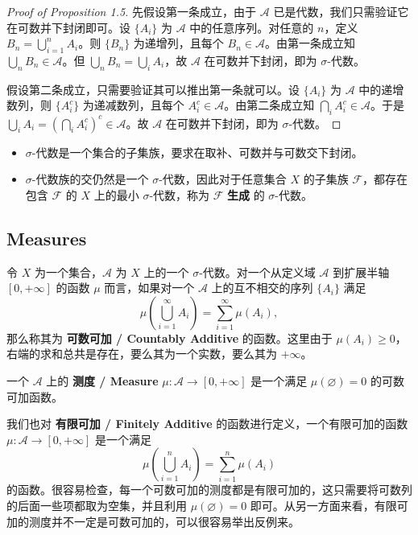 \documentclass[11pt]{article}
\newcommand{\calA}{\mathcal{A}}
\newcommand{\calF}{\mathcal{F}}
\newcommand{\diam}{\varnothing}
\begin{document}
\begin{proof}[Proof of Proposition 1.5]
    先假设第一条成立，由于 $\calA$ 已是代数，我们只需验证它在可数并下封闭即可。设 $\{A_i\}$ 为 $\calA$ 中的任意序列。对任意的 $n$，定义 $B_n = \bigcup_{i=1}^n A_i$。则 $\{B_n\}$ 为递增列，且每个 $B_n \in \calA$。由第一条成立知 $\bigcup_n B_n \in \calA$。但 $\bigcup_n B_n = \bigcup_i A_i$，故 $\calA$ 在可数并下封闭，即为 $\sigma$-代数。

    假设第二条成立，只需要验证其可以推出第一条就可以。设 $\{A_i\}$ 为 $\calA$ 中的递增数列，则 $\{A_i^c\}$ 为递减数列，且每个 $A_i^c \in \calA$。由第二条成立知 $\bigcap_i A_i^c \in \calA$。于是 $\bigcup_i A_i = \left(\bigcap_i A_i^c\right)^c \in \calA$。故 $\calA$ 在可数并下封闭，即为 $\sigma$-代数。
\end{proof}

\begin{cbox}[title=Takeaway for Section 1.1]
    \begin{itemize}
        \item $\sigma$-代数是一个集合的子集族，要求在取补、可数并与可数交下封闭。
        \item $\sigma$-代数族的交仍然是一个 $\sigma$-代数，因此对于任意集合 $X$ 的子集族 $\calF$，都存在包含 $\calF$ 的 $X$ 上的最小 $\sigma$-代数，称为 $\calF$ {\normalfont\bfseries 生成} 的 $\sigma$-代数。
    \end{itemize}
\end{cbox}

\subsection{Measures}

令 $X$ 为一个集合，$\calA$ 为 $X$ 上的一个 $\sigma$-代数。对一个从定义域 $\calA$ 到扩展半轴 $[0,+\infty]$ 的函数 $\mu$ 而言，如果对一个 $\calA$ 上的互不相交的序列 $\{A_i\}$ 满足
\[
    \mu\left(\bigcup_{i=1}^{\infty} A_i\right) = \sum_{i=1}^{\infty} \mu(A_i),
\]
那么称其为 {\normalfont\bfseries 可数可加 / Countably Additive} 的函数。这里由于 $\mu(A_i) \ge 0$，右端的求和总共是存在，要么其为一个实数，要么其为 $+\infty$。

\begin{definition}[Measure]
    一个 $\calA$ 上的 {\normalfont\bfseries 测度 / Measure} $\mu : \calA \to [0,+\infty]$ 是一个满足 $\mu(\diam)=0$ 的可数可加函数。
\end{definition}

我们也对 {\normalfont\bfseries 有限可加 / Finitely Additive} 的函数进行定义，一个有限可加的函数 $\mu : \calA \to [0,+\infty]$ 是一个满足
\[
    \mu\left(\bigcup_{i=1}^n A_i\right) = \sum_{i=1}^n \mu(A_i)
\]
的函数。很容易检查，每一个可数可加的测度都是有限可加的，这只需要将可数列的后面一些项都取为空集，并且利用 $\mu(\diam)=0$ 即可。从另一方面来看，有限可加的测度并不一定是可数可加的，可以很容易举出反例来。
\end{document}
